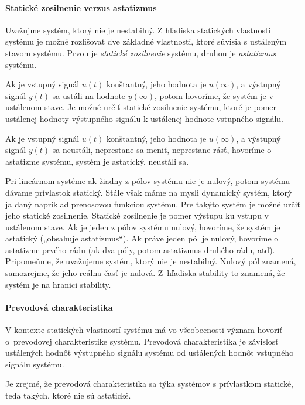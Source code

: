 \documentclass[a4paper, 10pt, ]{article}
\begin{document}
\paragraph{Statické zosilnenie verzus astatizmus}

Uvažujme systém, ktorý nie je nestabilný. Z hľadiska statických vlastností systému je možné rozlišovať dve základné vlastnosti, ktoré súvisia s ustáleným stavom systému. Prvou je \emph{statické zosilnenie} systému, druhou je \emph{astatizmus} systému.

Ak je vstupný signál $u(t)$ konštantný, jeho hodnota je $u(\infty)$, a výstupný signál $y(t)$ sa ustáli na hodnote $y(\infty)$, potom hovoríme, že systém je v ustálenom stave. Je možné určiť statické zosilnenie systému, ktoré je pomer ustálenej hodnoty výstupného signálu k ustálenej hodnote vstupného signálu.

Ak je vstupný signál $u(t)$ konštantný, jeho hodnota je $u(\infty)$, a výstupný signál $y(t)$ sa neustáli, neprestane sa meniť, neprestane rásť, hovoríme o astatizme systému, systém je astatický, neustáli sa.


\smallskip

Pri lineárnom systéme ak žiadny z pólov systému nie je nulový, potom systému dávame prívlastok statický. Stále však máme na mysli dynamický systém, ktorý ja daný napríklad prenosovou funkciou systému. Pre takýto systém je možné určiť jeho statické zosilnenie. Statické zosilnenie je pomer výstupu ku vstupu v ustálenom stave. Ak je jeden z pólov systému nulový, hovoríme, že systém je astatický („obsahuje astatizmus“). Ak práve jeden pól je nulový, hovoríme o astatizme prvého rádu (ak dva póly, potom astatizmus druhého rádu, atď). Pripomeňme, že uvažujeme systém, ktorý nie je nestabilný. Nulový pól znamená, samozrejme, že jeho reálna časť je nulová. Z~hľadiska stability to znamená, že systém je na hranici stability.


\paragraph{Prevodová charakteristika}

V kontexte statických vlastností systému má vo všeobecnosti význam hovoriť o~prevodovej charakteristike systému. Prevodová charakteristika je závislosť ustálených hodnôt výstupného signálu systému od ustálených hodnôt vstupného signálu systému.

Je zrejmé, že prevodová charakteristika sa týka systémov s prívlastkom statické, teda takých, ktoré nie sú astatické.
\end{document}
